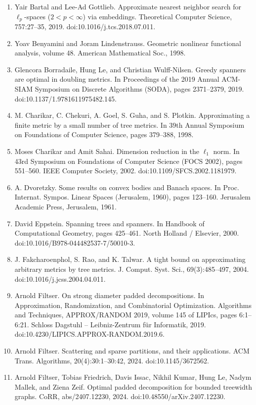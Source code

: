 \documentclass[10pt,a4paper]{amsart}
\begin{document}
\begin{enumerate}
\item  [10]  Yair Bartal and Lee-Ad Gottlieb.  Approximate nearest neighbor search for $\ell_{p}$-spaces ($2<p<\infty$) via embeddings.  Theoretical Computer Science, 757:27–35, 2019.  doi:10.1016/j.tcs.2018.07.011.  
\item  [11]  Yoav Benyamini and Joram Lindenstrauss.  Geometric nonlinear functional analysis, volume 48.  American Mathematical Soc., 1998.  
\item  [12]  Glencora Borradaile, Hung Le, and Christian Wulff-Nilsen.  Greedy spanners are optimal in doubling metrics.  In Proceedings of the 2019 Annual ACM-SIAM Symposium on Discrete Algorithms (SODA), pages 2371–2379, 2019.  doi:10.1137/1.9781611975482.145.  
\item  [13]  M. Charikar, C. Chekuri, A. Goel, S. Guha, and S. Plotkin.  Approximating a finite metric by a small number of tree metrics.  In 39th Annual Symposium on Foundations of Computer Science, pages 379–388, 1998.  
\item  [14]  Moses Charikar and Amit Sahai.  Dimension reduction in the $\ell_{1}$ norm.  In 43rd Symposium on Foundations of Computer Science (FOCS 2002), pages 551–560. IEEE Computer Society, 2002.  doi:10.1109/SFCS.2002.1181979.  
\item  [15]  A. Dvoretzky.  Some results on convex bodies and Banach spaces.  In Proc. Internat. Sympos. Linear Spaces (Jerusalem, 1960), pages 123–160. Jerusalem Academic Press, Jerusalem, 1961.  
\item  [16]  David Eppstein.  Spanning trees and spanners.  In Handbook of Computational Geometry, pages 425–461. North Holland / Elsevier, 2000.  doi:10.1016/B978-044482537-7/50010-3.  
\item  [17]  J. Fakcharoenphol, S. Rao, and K. Talwar.  A tight bound on approximating arbitrary metrics by tree metrics.  J. Comput. Syst. Sci., 69(3):485–497, 2004.  doi:10.1016/j.jcss.2004.04.011.  
\item  [18]  Arnold Filtser.  On strong diameter padded decompositions.  In Approximation, Randomization, and Combinatorial Optimization. Algorithms and Techniques, APPROX/RANDOM 2019, volume 145 of LIPIcs, pages 6:1–6:21. Schloss Dagstuhl – Leibniz-Zentrum für Informatik, 2019.  doi:10.4230/LIPICS.APPROX-RANDOM.2019.6.  
\item  [19]  Arnold Filtser.  Scattering and sparse partitions, and their applications.  ACM Trans. Algorithms, 20(4):30:1–30:42, 2024.  doi:10.1145/3672562.  
\item  [20]  Arnold Filtser, Tobias Friedrich, Davis Issac, Nikhil Kumar, Hung Le, Nadym Mallek, and Ziena Zeif.  Optimal padded decomposition for bounded treewidth graphs.  CoRR, abs/2407.12230, 2024.  doi:10.48550/arXiv.2407.12230.  

\end{enumerate}
\end{document}
